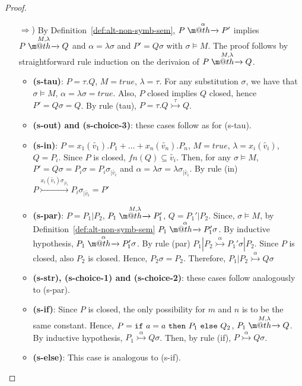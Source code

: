 \documentclass[submission,copyright,creativecommons]{eptcs}
\makeatletter
\newcommand{\inp}[2]{#1(#2)}
\newcommand{\ifte}[3]{{\tt if}\ #1\ {\tt then }\ #2\ {\tt else }\ #3}
\newcommand{\tuple}[1]{\widetilde{#1}}
\newcommand{\tr}[1]{\stackrel{#1}{\rightarrowfill}}
\newcommand{\tra}[1]{\stackrel{#1}{\rightarrowtail}}
\newcommand{\true}{\mathit{true}}
\def \rightarrowfill{\m@th\mathord{\smash-}\mkern-6mu\cleaders\hbox{$\mkern-2mu\mathord{\smash-}\mkern-2mu$}\hfill
  \mkern-6mu\mathord\rightarrow}
\makeatother
\begin{document}
\begin{proof}


  \begin{itemize} 
    \item[$\Rightarrow$)] By Definition~\ref{def:alt-non-symb-sem}, $P\tr {\alpha} P'$ implies $P\tr {M, \lambda} Q$ and  $\alpha = \lambda\sigma$ and 
    $P'=Q\sigma$ with $\sigma \models M$. The proof follows by straightforward rule induction on the derivaion of $P\tr {M, \lambda} Q$.
       \begin{itemize}
          \item {\bf({\sc s-tau})}: $P = \tau.Q$, $M= true$, $\lambda=\tau$. For any substitution $\sigma$, we have that 
          $\sigma \models M$, $\alpha = \lambda\sigma = \true$. Also, $P$ closed implies $Q$ closed, hence $P' = Q \sigma = Q$. By rule
          ({\sc tau}), $P = \tau.Q \tra{\tau} Q$. 
          \item {\bf({\sc s-out}) and \bf({\sc s-choice-3})}: these cases follow as for ({\sc s-tau}).
          \item {\bf({\sc s-in})}: $P={\inp{x_1}{\tuple{v_1}}.P_1+ \ldots+\inp{x_n}{\tuple{v_n}}.P_n}$, $M=true$, $\lambda=\inp{x_i}{\tuple{v_i}}$,
          $Q = P_i$. Since $P$ is closed, $fn(Q) \subseteq \tuple{v_i}$. Then, for any $\sigma \models M$, $P'= Q\sigma = P_i\sigma = P_i\sigma_{|\tuple{v_i}}$ and $\alpha = \lambda\sigma = \lambda\sigma_{|\tuple{v_i}}$. By rule ({\sc in}) $P \tra {\inp{x_i}{\tuple{v_i}}\sigma_{|\tuple{v_i}}} P_i\sigma_{|\tuple{v_i}} = P'$
          \item {\bf({\sc s-par})}: $P = P_1 | P_2$, $P_1\tr{M,\lambda} P_1'$,
          $Q = P_1'|P_2$. Since, $\sigma \models M$, by Definition~\ref{def:alt-non-symb-sem} $P_1\tr{\alpha} P_1'\sigma$. 
          By inductive hypothesis,  $P_1\tr{\alpha} P_1'\sigma$. By rule ({\sc par}) $P_1|P_2\tra{\alpha} P_1'\sigma|P_2$. Since
          $P$ is closed, also $P_2$ is closed. Hence, $P_2\sigma = P_2$. Therefore, $P_1|P_2\tra{\alpha} Q\sigma$
          \item {\bf({\sc s-str}), \bf({\sc s-choice-1}) and \bf({\sc s-choice-2})}: these cases follow analogously to ({\sc s-par}).
          \item {\bf({\sc s-if})}: Since $P$ is closed, the only possibility for $m$ and $n$ is to be the same constant. Hence, $P = \ifte{a=a}{P_1}{Q_2}$, $P_1\tr{M,\lambda} Q$. By inductive hypothesis, $P_1\tra{\alpha} Q\sigma$. Then, by rule ({\sc if}),  $P\tra{\alpha} Q\sigma$.
          \item {\bf({\sc s-else})}: This case is analogous to ({\sc s-if}).
       \end{itemize}


\end{itemize}
\end{proof}
\end{document}
